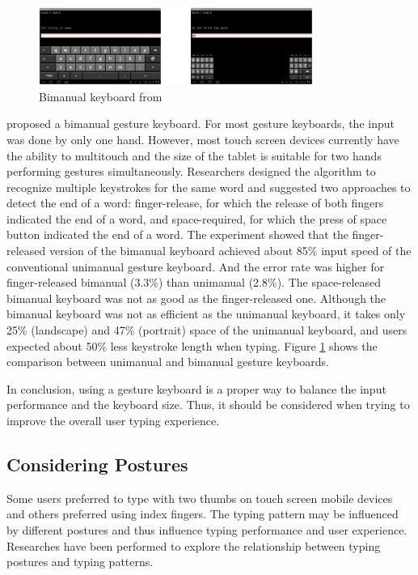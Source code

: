 \documentclass[11pt]{article}
\begin{document}
\begin{figure}[H]
  \centering
  \includegraphics[width=0.8\textwidth]{Bimanual.png}
  \caption{Bimanual keyboard from \citep{10.1145/2380116.2380136}}
  \label{fig:bimanual}
\end{figure}

\citet{10.1145/2380116.2380136} proposed a bimanual gesture keyboard. For most gesture keyboards, the input was done by only one hand. However, most touch screen devices currently have the ability to multitouch and the size of the tablet is suitable for two hands performing gestures simultaneously. Researchers designed the algorithm to recognize multiple keystrokes for the same word and suggested two approaches to detect the end of a word: finger-release, for which the release of both fingers indicated the end of a word, and space-required, for which the press of space button indicated the end of a word. The experiment showed that the finger-released version of the bimanual keyboard achieved about 85\% input speed of the conventional unimanual gesture keyboard. And the error rate was higher for finger-released bimanual (3.3\%) than unimanual (2.8\%). The space-released bimanual keyboard was not as good as the finger-released one. Although the bimanual keyboard was not as efficient as the unimanual keyboard, it takes only 25\% (landscape) and 47\% (portrait) space of the unimanual keyboard, and users expected about 50\% less keystroke length when typing. Figure \ref{fig:bimanual} shows the comparison between unimanual and bimanual gesture keyboards.

In conclusion, using a gesture keyboard is a proper way to balance the input performance and the keyboard size. Thus, it should be considered when trying to improve the overall user typing experience.

\subsection{Considering Postures}
Some users preferred to type with two thumbs on touch screen mobile devices and others preferred using index fingers. The typing pattern may be influenced by different postures and thus influence typing performance and user experience. Researches have been performed to explore the relationship between typing postures and typing patterns.
\end{document}
